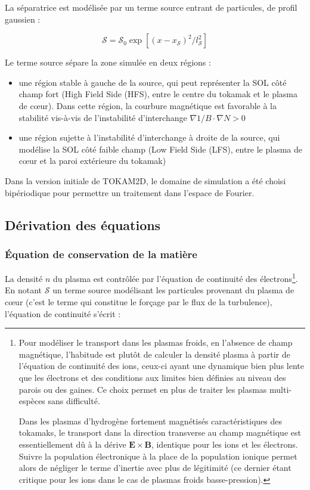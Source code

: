 \begin{refsection}
La séparatrice est modélisée par un terme source entrant de particules, de profil gaussien :

\begin{equation}
\mathcal S=\mathcal{S}_0 \exp[(x-x_\mathcal{S})^2/l_\mathcal{S}^2]
\end{equation}

Le terme source sépare la zone
simulée en deux régions :

\begin{itemize}
  \item une région stable à gauche
  de la source, qui peut représenter la SOL côté champ fort (High Field
  Side (HFS), entre le centre du tokamak et le plasma de c\oe ur). Dans cette
  région, la courbure magnétique est favorable à la stabilité vis-à-vis de l'instabilité
  d'interchange $\nabla 1/B\cdot\nabla N>0$
  \item une région sujette à l'instabilité d'interchange à
  droite de la source, qui modélise la SOL côté faible champ (Low Field Side
  (LFS), entre le plasma de c\oe ur et la paroi extérieure du tokamak)
 \end{itemize}
 
Dans la version initiale de TOKAM2D, le domaine de simulation a été choisi
bipériodique pour permettre un traitement dans l'espace
de Fourier.

\subsection{Dérivation des équations}
\subsubsection{Équation de conservation de la matière}
La densité $n$ du plasma est contrôlée par l'équation de continuité des
électrons\footnote{Pour modéliser le transport dans les plasmas froids, en
l'absence de champ magnétique, l'habitude est plutôt de calculer la densité
plasma à partir de l'équation de continuité des ions, ceux-ci ayant une
dynamique bien plus lente que les électrons et des conditions aux limites
bien définies au niveau des parois ou des gaines. Ce choix permet en plus de
traiter les plasmas multi-espèces sans difficulté.

Dans les plasmas d'hydrogène fortement magnétisés caractéristiques des tokamaks,
le transport dans la direction transverse au champ magnétique est
essentiellement dû à la dérive $\mathbf E\times\mathbf B$, identique pour les
ions et les électrons. Suivre la population électronique à la place de la
population ionique permet alors de négliger le terme d'inertie avec plus de
légitimité (ce dernier étant critique pour les ions dans le cas de plasmas
froids basse-pression).}.
En notant $\mathcal{S}$ un
terme source modélisant les particules provenant du plasma de
c\oe{}ur (c'est le terme qui constitue le forçage par le flux de la turbulence),
l'équation de continuité s'écrit :


\end{refsection}
